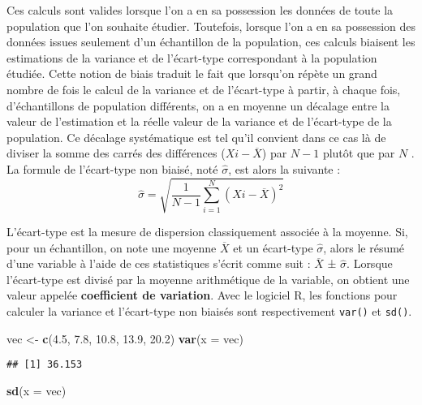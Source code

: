 \documentclass[
  french,
]{book}
\newenvironment{Shaded}{\begin{snugshade}}{\end{snugshade}}
\newcommand{\DataTypeTok}[1]{\textcolor[rgb]{0.13,0.29,0.53}{#1}}
\newcommand{\FloatTok}[1]{\textcolor[rgb]{0.00,0.00,0.81}{#1}}
\newcommand{\KeywordTok}[1]{\textcolor[rgb]{0.13,0.29,0.53}{\textbf{#1}}}
\newcommand{\NormalTok}[1]{#1}
\newcommand{\StringTok}[1]{\textcolor[rgb]{0.31,0.60,0.02}{#1}}
\begin{document}
Ces calculs sont valides lorsque l'on a en sa possession les données de toute la population que l'on souhaite étudier. Toutefois, lorsque l'on a en sa possession des données issues seulement d'un échantillon de la population, ces calculs biaisent les estimations de la variance et de l'écart-type correspondant à la population étudiée. Cette notion de biais traduit le fait que lorsqu'on répète un grand nombre de fois le calcul de la variance et de l'écart-type à partir, à chaque fois, d'échantillons de population différents, on a en moyenne un décalage entre la valeur de l'estimation et la réelle valeur de la variance et de l'écart-type de la population. Ce décalage systématique est tel qu'il convient dans ce cas là de diviser la somme des carrés des différences (\(X{i} - \overline{X}\)) par \(N-1\) plutôt que par \(N\) \autocite{grenierQuelleEstBonne2007}. La formule de l'écart-type non biaisé, noté \emph{\(\hat{\sigma}\)}, est alors la suivante :
\[\hat{\sigma} = \sqrt{\frac{1}{N-1}\sum_{i=1}^{N} (X{i} - \overline{X})^2}\]

L'écart-type est la mesure de dispersion classiquement associée à la moyenne. Si, pour un échantillon, on note une moyenne \(\overline{X}\) et un écart-type \(\hat{\sigma}\), alors le résumé d'une variable à l'aide de ces statistiques s'écrit comme suit : \(\overline{X}\) ± \(\hat{\sigma}\). Lorsque l'écart-type est divisé par la moyenne arithmétique de la variable, on obtient une valeur appelée \textbf{coefficient de variation}. Avec le logiciel R, les fonctions pour calculer la variance et l'écart-type non biaisés sont respectivement \texttt{var()} et \texttt{sd()}.

\begin{Shaded}
\begin{Highlighting}[]
\NormalTok{vec <-}\StringTok{ }\KeywordTok{c}\NormalTok{(}\FloatTok{4.5}\NormalTok{, }\FloatTok{7.8}\NormalTok{, }\FloatTok{10.8}\NormalTok{, }\FloatTok{13.9}\NormalTok{, }\FloatTok{20.2}\NormalTok{)}
\KeywordTok{var}\NormalTok{(}\DataTypeTok{x =}\NormalTok{ vec)}
\end{Highlighting}
\end{Shaded}

\begin{verbatim}
## [1] 36.153
\end{verbatim}

\begin{Shaded}
\begin{Highlighting}[]
\KeywordTok{sd}\NormalTok{(}\DataTypeTok{x =}\NormalTok{ vec)}
\end{Highlighting}
\end{Shaded}
\end{document}
